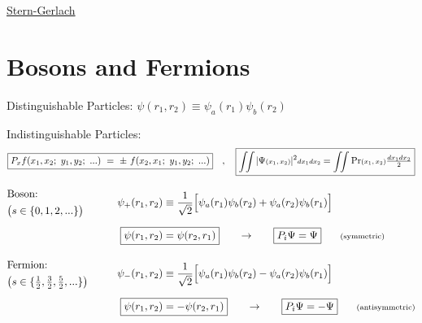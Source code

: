 \documentclass[12pt]{article}
\newcommand{\hs}{\hspace{1pt}} %
\newcommand{\mss}[1]{\text{\scriptsize\(#1\)}} %
\begin{document}
\vspace{20pt} \noindent
\underline{Stern-Gerlach}

\newpage
\section{Bosons and Fermions}

\vspace{5pt} \noindent
Distinguishable Particles: \hspace{18pt}
\(\boxed{ \psi(r_1,r_2) \equiv \psi_a(r_1) \psi_b(r_2) }\)

\vspace{15pt} \noindent
Indistinguishable Particles:
\[
    \boxed{ P_x f(x_1, x_2; \ y_1, y_2; \ ...) \ = \ \pm \ f(x_2, x_1; \ y_1, y_2; \ ...) }
    \hspace{10pt} , \hspace{10pt} 
    \boxed{ 
        \mss{\iint} \hs | \Psi \mss{(x_1, x_2)} |^2 \mss{dx_1 dx_2} = \mss{\iint} \hs\hs \text{Pr} \mss{(x_1, x_2)} \tfrac{dx_1 dx_2}{2} 
    }
\]

\vspace{5pt} \hspace{18pt} \(\begin{aligned}
    & \begin{aligned}
            &\text{Boson:}\\
            &\big( s \in \{ 0,1,2,... \} \big)
        \end{aligned} 
        & \hspace{18pt} \psi_+(r_1,r_2) 
        & \equiv \frac{1}{\sqrt{2}} \Big[ \psi_a(r_1) \psi_b(r_2) + \psi_a(r_2) \psi_b(r_1)  \Big] 
        \\[5pt]
    && \Aboxed{ \psi(r_1,r_2) 
        & = \psi(r_2,r_1) } \hspace{18pt} \rightarrow \hspace{18pt} \boxed{P_i \Psi = \Psi} \hspace{18pt} \text{\scriptsize(symmetric)}
        \\[10pt]
    &\begin{aligned}
            &\text{Fermion:}\\
            &\big( s \in \{ \tfrac{1}{2}, \tfrac{3}{2}, \tfrac{5}{2}, ... \} \big)
        \end{aligned}
        & \hspace{18pt} \psi_-(r_1,r_2) 
        &\equiv \frac{1}{\sqrt{2}} \Big[ \psi_a(r_1) \psi_b(r_2) - \psi_a(r_2) \psi_b(r_1)\Big]\\[5pt]
        && \Aboxed{ \psi(r_1,r_2) 
        &= - \psi(r_2,r_1) }
        \hspace{18pt} \rightarrow \hspace{18pt} \boxed{P_i \Psi = - \Psi} 
        \hspace{18pt} \text{\scriptsize(antisymmetric)}
\end{aligned}\)
\end{document}
